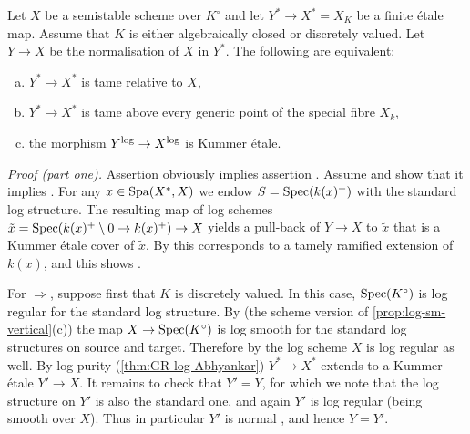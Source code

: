\begin{thm} \label{thm:scheme-Abhyankar}
  Let $X$ be a semistable scheme over $K^\circ$ and let $Y^*\to X^* = X_K$ be a finite \'etale map.  Assume that $K$ is either algebraically closed or discretely valued. 
 Let $Y\to X$ be the normalisation of $X$ in $Y^*$. The following are equivalent:
  \begin{enumerate}[(a)]
    \item \label{propitem:Abhy-tame} 
        $Y^*\to X^*$ is tame relative to $X$,
    \item \label{propitem:Abhy-tame-boundary}
        $Y^*\to X^*$ is tame above every generic point of the special fibre $X_k$,
    \item \label{propitem:Abhy-ket}
        the morphism $Y^{\rm log}\to X^{\rm log}$ is Kummer \'etale.
  \end{enumerate}
\end{thm}

\noindent\emph{Proof (part one).} 
\label{proof:scheme-Abhyankar}
Assertion  obviously implies assertion . Assume  and show that it implies . For any $x \in \operatorname{Spa}(X^*,X)$ we endow $S = \operatorname{Spec}(k(x)^+)$ with the standard log structure. The resulting  map of log schemes $\tilde{x} = \operatorname{Spec}(k(x)^+ \setminus 0 \to k(x)^+) \to X$ yields a pull-back of $Y \to X$ to $\tilde{x}$ that is a Kummer \'etale cover of $\tilde{x}$.
By  \cite[Corollary 4.4.9]{AHLS-Log} this corresponds to a tamely ramified extension of $k(x)$, and this shows .

For $\Rightarrow$, suppose first that $K$ is discretely valued. In this case, $\operatorname{Spec}(K^\circ)$ is log regular for the standard log structure. By \cite[Corollary~5.3.7]{AHLS-Log} (the scheme version of  \cref{prop:log-sm-vertical}(c)) the map $X\to \operatorname{Spec}(K^\circ)$ is log smooth for the standard log structures on source and target. Therefore by \cite[Theorem~8.2]{KatoToricSingularities} the log scheme $X$ is log regular as well. By log purity (\cref{thm:GR-log-Abhyankar}) $Y^*\to X^*$ extends to a Kummer \'etale $Y'\to X$. It remains to check that $Y'=Y$, for which we note that the log structure on $Y'$ is also the standard one, and again $Y'$ is log regular (being smooth over $X$). Thus in particular $Y'$ is normal \cite[Theorem~4.1]{KatoToricSingularities}, and hence $Y=Y'$.

